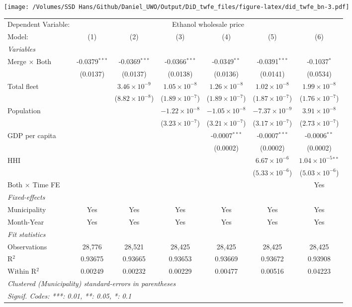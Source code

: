 \documentclass[
]{article}
\begin{document}
\texttt{[image: /Volumes/SSD Hans/Github/Daniel\_UWO/Output/DiD\_twfe\_files/figure-latex/did\_twfe\_bn-3.pdf]}

\begin{tabular}{lcccccc}
\tabularnewline\midrule\midrule
Dependent Variable:&\multicolumn{6}{c}{Ethanol wholesale price}\\
Model:&(1) & (2) & (3) & (4) & (5) & (6)\\
\midrule \emph{Variables}&   &   &   &   &   &  \\
Merge $\times $ Both & -0.0379$^{***}$ & -0.0369$^{***}$ & -0.0366$^{***}$ & -0.0349$^{**}$ & -0.0391$^{***}$ & -0.1037$^{*}$\\
  &(0.0137) & (0.0137) & (0.0138) & (0.0136) & (0.0141) & (0.0534)\\
Total fleet &    & $3.46\times 10^{-9}$ & $1.05\times 10^{-8}$ & $1.26\times 10^{-8}$ & $1.02\times 10^{-8}$ & $1.99\times 10^{-8}$\\
  &   & ($8.82\times 10^{-8}$) & ($1.89\times 10^{-7}$) & ($1.89\times 10^{-7}$) & ($1.87\times 10^{-7}$) & ($1.76\times 10^{-7}$)\\
Population &    &    & $-1.22\times 10^{-8}$ & $-1.05\times 10^{-8}$ & $-7.37\times 10^{-9}$ & $3.91\times 10^{-8}$\\
  &   &    & ($3.23\times 10^{-7}$) & ($3.21\times 10^{-7}$) & ($3.17\times 10^{-7}$) & ($2.73\times 10^{-7}$)\\
GDP per capita &    &    &    & -0.0007$^{***}$ & -0.0007$^{***}$ & -0.0006$^{**}$\\
  &   &    &    & (0.0002) & (0.0002) & (0.0002)\\
HHI &    &    &    &    & $6.67\times 10^{-6}$ & $1.04\times 10^{-5}$$^{**}$\\
  &   &    &    &    & ($5.33\times 10^{-6}$) & ($5.03\times 10^{-6}$)\\
Both $\times$ Time FE &  &  &  &  &  & Yes\\
\midrule \emph{Fixed-effects}&   &   &   &   &   &  \\
Municipality & Yes & Yes & Yes & Yes & Yes & Yes\\
Month-Year & Yes & Yes & Yes & Yes & Yes & Yes\\
\midrule \emph{Fit statistics}&  & & & & & \\
Observations & 28,776&28,521&28,425&28,425&28,425&28,425\\
R$^2$ & 0.93675&0.93665&0.93653&0.93669&0.93672&0.93908\\
Within R$^2$ & 0.00249&0.00232&0.00229&0.00477&0.00516&0.04223\\
\midrule\midrule\multicolumn{7}{l}{\emph{Clustered (Municipality) standard-errors in parentheses}}\\
\multicolumn{7}{l}{\emph{Signif. Codes: ***: 0.01, **: 0.05, *: 0.1}}\\
\end{tabular}
\end{document}
